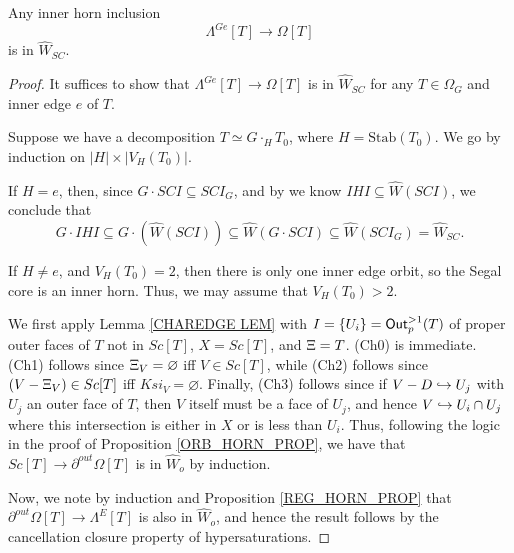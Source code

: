 \documentclass[a4paper,10pt,draft]{article}%
\begin{document}
\begin{proposition}
      \label{GHORN_IN_SC_PROP}
      Any inner horn inclusion
      \begin{equation}
            \Lambda^{G e}[T] \to \Omega[T]
      \end{equation}
      is in $\hat{W}_{SC}.$
\end{proposition}
\begin{proof}
      It suffices to show that $\Lambda^{G e}[T] \to \Omega[T]$ is in $\hat{W}_{SC}$
      for any $T\in \Omega_G$ and inner edge $e$ of $T$.

      Suppose we have a decomposition $T \simeq G \cdot_H T_0$, where $H = \mathrm{Stab}(T_0)$.
      We go by induction on $|H| \times |V_H(T_0)|$.
      
      If $H = e$, then, since $G \cdot SCI \subseteq SCI_G$,
      and by \cite[2.5]{CM13a} we know $IHI \subseteq \hat{W}(SCI)$, we conclude that
      \begin{equation}
            G \cdot IHI \subseteq G \cdot (\hat{W}(SCI)) \subseteq \hat{W}(G \cdot SCI) \subseteq \hat{W}(SCI_G) = \hat{W}_{SC}.
      \end{equation}
      
      If $H \neq e$, and $V_H(T_0) = 2$, then there is only one inner edge orbit, so
      the Segal core is an inner horn.
      Thus, we may assume that $V_H(T_0) > 2$.

      We first apply Lemma \ref{CHAREDGE LEM} with
      $I = \left\{U_i\right\} = \mathsf{Out}^{>1}_p(T)$ of proper outer faces of $T$ not in $Sc[T]$,
      $X = Sc[T]$,
      and
      $\Xi = T$. 
      (Ch0) is immediate.
      (Ch1) follows since $\Xi_V = \varnothing$ iff $V \in Sc[T]$, while
      (Ch2) follows since $(V - \Xi_V) \in Sc[T]$ iff $Ksi_V = \varnothing$.
      Finally, (Ch3) follows since if $V - D \hookrightarrow U_j$ with $U_j$ an outer face of $T$,
      then $V$ itself must be a face of $U_j$, and hence
      $V \hookrightarrow U_i \cap U_j$ where this intersection is either in $X$ or is less than $U_i$.
      Thus, following the logic in the proof of Proposition \ref{ORB_HORN_PROP}, we have that
      $Sc[T] \to \partial^{out}\Omega[T]$
      is in $\hat{W}_o$ by induction.
      
      Now, we note by induction and Proposition \ref{REG_HORN_PROP} that
      $\partial^{out}\Omega[T] \to \Lambda^E[T]$
      is also in $\hat{W}_o$,
      and hence the result follows by the cancellation closure property of hypersaturations.
\end{proof}
\end{document}
